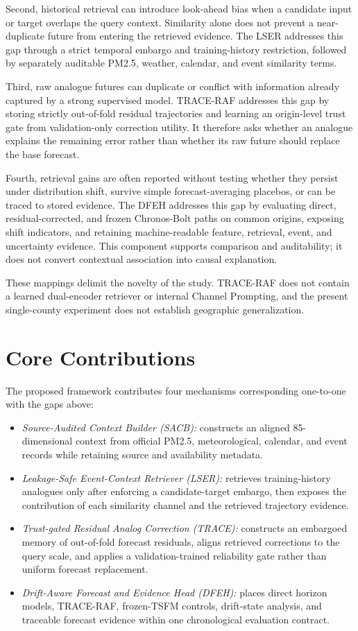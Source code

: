 \documentclass{ieeeaccess}
\begin{document}
Second, historical retrieval can introduce look-ahead bias when a candidate
input or target overlaps the query context. Similarity alone does not prevent a
near-duplicate future from entering the retrieved evidence. The LSER addresses
this gap through a strict temporal embargo and training-history restriction,
followed by separately auditable PM2.5, weather, calendar, and event similarity
terms.

Third, raw analogue futures can duplicate or conflict with information already
captured by a strong supervised model. TRACE-RAF addresses this gap by storing
strictly out-of-fold residual trajectories and learning an origin-level trust
gate from validation-only correction utility. It therefore asks whether an
analogue explains the remaining error rather than whether its raw future should
replace the base forecast.

Fourth, retrieval gains are often reported without testing whether they persist
under distribution shift, survive simple forecast-averaging placebos, or can be
traced to stored evidence. The DFEH addresses this gap by evaluating direct,
residual-corrected, and frozen Chronos-Bolt paths on common origins, exposing
shift indicators, and retaining machine-readable feature, retrieval, event,
and uncertainty evidence. This component supports comparison and auditability;
it does not convert contextual association into causal explanation.

These mappings delimit the novelty of the study. TRACE-RAF does not contain
a learned dual-encoder retriever or internal Channel Prompting, and the present
single-county experiment does not establish geographic generalization.

\section{Core Contributions}

The proposed framework contributes four mechanisms corresponding one-to-one
with the gaps above:
\begin{itemize}
    \item \textit{Source-Audited Context Builder (SACB):} constructs an aligned
    85-dimensional context from official PM2.5, meteorological, calendar, and
    event records while retaining source and availability metadata.
    \item \textit{Leakage-Safe Event-Context Retriever (LSER):} retrieves
    training-history analogues only after enforcing a candidate-target embargo,
    then exposes the contribution of each similarity channel and the retrieved
    trajectory evidence.
    \item \textit{Trust-gated Residual Analog Correction (TRACE):} constructs
    an embargoed memory of out-of-fold forecast residuals, aligns retrieved
    corrections to the query scale, and applies a validation-trained reliability
    gate rather than uniform forecast replacement.
    \item \textit{Drift-Aware Forecast and Evidence Head (DFEH):} places direct
    horizon models, TRACE-RAF, frozen-TSFM controls, drift-state analysis, and
    traceable forecast evidence within one chronological evaluation contract.
\end{itemize}
\end{document}
